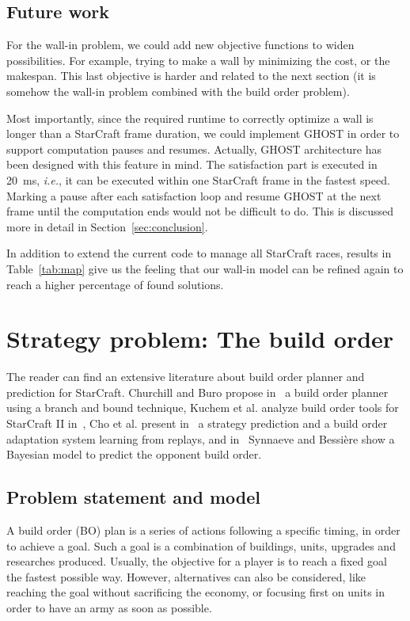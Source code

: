 \documentclass[journal]{IEEEtran}
\newcommand{\ghost}{\textsc{GHOST}\xspace}
\newcommand{\ie}{\textit{i.e.}}
\begin{document}
\subsection{Future work}

For the wall-in problem, we could add new objective functions to widen
possibilities. For  example, trying to  make a wall by  minimizing the
cost, or the makespan.  This last objective is harder and related to
the  next  section (it  is  somehow  the  wall-in problem combined with the  build  order
problem).

Most importantly, since  the required runtime to  correctly optimize a
wall is  longer than  a StarCraft frame  duration, we  could implement
\ghost in order  to support computation pauses  and resumes. Actually,
\ghost architecture has been designed with this feature in mind.
The satisfaction  part is executed  in 20~ms,  \ie, it can  be executed
within one StarCraft frame in the fastest speed.  Marking a pause after
each satisfaction loop  and resume \ghost at the next  frame until the
computation ends would not be difficult  to do. This is discussed more
in detail in Section~\ref{sec:conclusion}.

In addition to extend the current  code to manage all StarCraft races,
results in  Table~\ref{tab:map} give us  the feeling that  our wall-in
model  can be  refined again  to reach  a higher  percentage of  found
solutions.


\section{Strategy problem: The build order}\label{sec:bo}

The reader can find an  extensive literature about build order planner
and   prediction  for   StarCraft.  Churchill   and  Buro   propose
in~\cite{ChurchillB11} a build order planner  using a branch and bound
technique, Kuchem  et al. analyze  build order tools for  StarCraft II
in~\cite{KuchemPR13},  Cho  et  al.    present  in~\cite{ChoKC13}  a
strategy prediction  and a build  order adaptation system  learning from
replays, and  in~\cite{SynnaeveB11-a} Synnaeve and Bessi{\`e}re  show a
Bayesian model to predict the opponent build order.

\subsection{Problem statement and model}
A build order (BO) plan is a series of actions following a specific
timing, in order to  achieve a goal.  Such a goal  is a combination of
buildings,  units, upgrades  and  researches  produced.  Usually,  the
objective for a  player is to reach a fixed  goal the fastest possible
way. However, alternatives  can also be considered,  like reaching the
goal without sacrificing  the economy, or focusing first  on units in
order to have an army as soon as possible.
\end{document}

